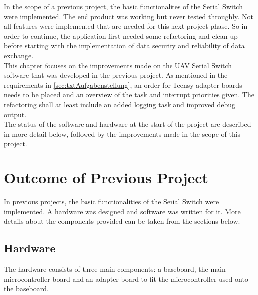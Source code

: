 %
In the scope of a previous project, the basic functionalites of the Serial Switch were implemented. The end product was working but never tested throughly. Not all features were implemented that are needed for this next project phase. So in order to continue, the application first needed some refactoring and clean up before starting with the implementation of data security and reliability of data exchange.\\
This chapter focuses on the improvements made on the UAV Serial Switch software that was developed in the previous project. As mentioned in the requirements in \autoref{sec:txtAufgabenstellung}, an order for Teensy adapter boards needs to be placed and an overview of the task and interrupt priorities given. The refactoring shall at least include an added logging task and improved debug output.\\
The status of the software and hardware at the start of the project are described in more detail below, followed by the improvements made in the scope of this project.
%
%
%
%
%
%
\section{Outcome of Previous Project}
In previous projects, the basic functionalities of the Serial Switch were implemented. A hardware was designed and software was written for it. More details about the components provided can be taken from the sections below.
%
%
%
\subsection{Hardware}
The hardware consists of three main components: a baseboard, the main microcontroller board and an adapter board to fit the microcontroller used onto the baseboard.
%
